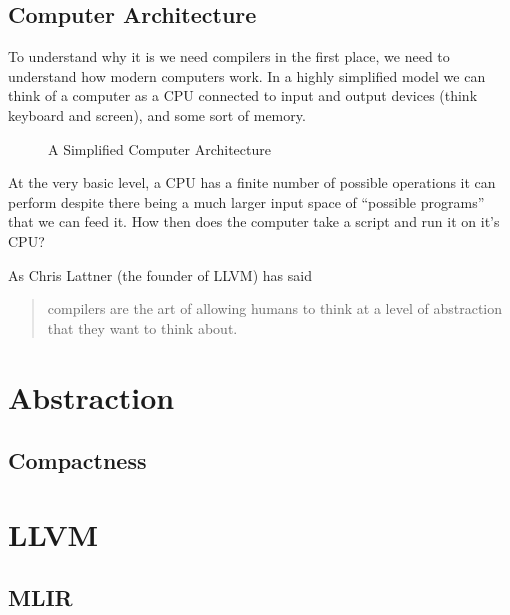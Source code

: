 \subsection{Computer Architecture}
To understand why it is we need compilers in the first place, we need to understand how modern computers work.
In a highly simplified model we can think of a computer as a \ac{CPU} connected to input and output devices (think keyboard and screen), and some sort of memory.
\begin{figure}[h]
    \centering
    \caption{A Simplified Computer Architecture}
    \label{fig:comparch}
\end{figure}

At the very basic level, a \ac{CPU} has a finite number of possible operations it can perform despite there being a much larger input space of ``possible programs'' that we can feed it.
How then does the computer take a script and run it on it's CPU?


As Chris Lattner (the founder of LLVM) has said
\begin{quote}
    compilers are the art of allowing humans to think at a level of abstraction that they want to think about.
\end{quote}

\section{Abstraction}

\subsection{Compactness}

\section{LLVM}

\subsection{MLIR}